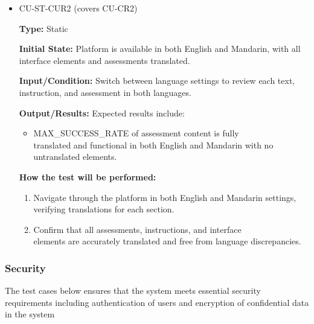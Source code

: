 \documentclass[12pt, titlepage]{article}
\begin{document}
\begin{itemize}
  \item CU-ST-CUR2 (covers CU-CR2)
  \begin{mdframed}[linewidth=0.5mm] 
    \textbf{Type:} Static \par 
    \textbf{Initial State:} Platform is available in both English and Mandarin, with all interface elements and assessments translated. \par 
    \textbf{Input/Condition:} Switch between language settings to review each text,\\
    instruction, and assessment in both languages. \par 
    \textbf{Output/Results:} Expected results include: 
    \begin{itemize} 
      \item MAX\_SUCCESS\_RATE of assessment content is fully \\translated and functional in both English and Mandarin with no \\untranslated elements. 
    \end{itemize} \par 
    \textbf{How the test will be performed:} 
    \begin{enumerate}[noitemsep] 
      \item Navigate through the platform in both English and Mandarin settings, verifying translations for each section. 
      \item Confirm that all assessments, instructions, and interface \\elements are accurately translated and free from language discrepancies. 
    \end{enumerate} 
  \end{mdframed} 
\end{itemize}

\subsubsection{Security}

The test cases below ensures that the system meets essential 
security requirements including authentication of users and encryption of 
confidential data in the system
		
\end{document}
